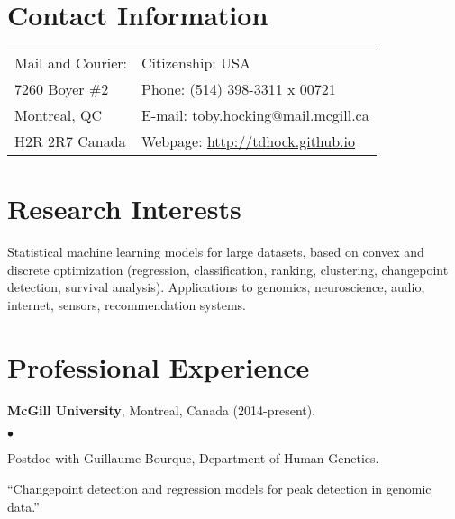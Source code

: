 \documentclass[margin,line]{res}
\newenvironment{list2}{
  \begin{list}{$\bullet$}{%
      \setlength{\itemsep}{0in}
      \setlength{\parsep}{0in} \setlength{\parskip}{0in}
      \setlength{\topsep}{0in} \setlength{\partopsep}{0in} 
      \setlength{\leftmargin}{0.2in}}}{\end{list}}
\begin{document}

\begin{resume}
\section{\sc Contact Information}
\vspace{.05in}
\begin{tabular*}{6.1in} {@{\extracolsep{\fill}}ll}
 Mail and Courier: & Citizenship: USA \\            
 7260 Boyer \#2  & Phone:  (514) 398-3311 x 00721 \\   
Montreal, QC & E-mail:  toby.hocking@mail.mcgill.ca       \\
H2R 2R7 Canada &  Webpage: \url{http://tdhock.github.io}\\     
\end{tabular*}


\section{\sc Research Interests}

Statistical machine learning models for large
datasets, based on convex and discrete optimization (regression,
classification, ranking, clustering, changepoint detection, survival
analysis). Applications to genomics, neuroscience,
audio, internet, sensors, recommendation systems.


\section{\sc Professional Experience}

{\bf McGill University}, Montreal, Canada (2014-present).\\
\vspace*{-.1in}
\begin{list2}
\item[] Postdoc with Guillaume Bourque, Department of Human Genetics.
\item[]``Changepoint detection and regression models for peak detection in genomic data.''
\end{list2}


\end{resume}
\end{document}
